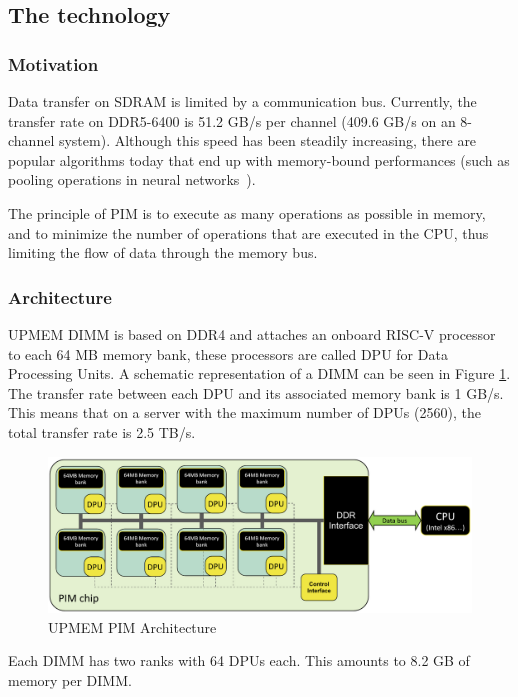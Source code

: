 \subsection{The technology}

\subsubsection{Motivation}

Data transfer on SDRAM is limited by a communication bus. Currently, the transfer rate on DDR5-6400 is 51.2 GB/s per channel (409.6 GB/s on an 8-channel system). Although this speed has been steadily increasing, there are popular algorithms today that end up with memory-bound performances (such as pooling operations in neural networks~\cite{nvidia.memory2020}).

The principle of PIM is to execute as many operations as possible in memory, and to minimize the number of operations that are executed in the CPU, thus limiting the flow of data through the memory bus.

\subsubsection{Architecture}

UPMEM DIMM is based on DDR4 and attaches an onboard RISC-V processor to each 64 MB memory bank, these processors are called DPU for Data Processing Units. A schematic representation of a DIMM can be seen in Figure \ref{fig:DIMM}. The transfer rate between each DPU and its associated memory bank is 1 GB/s. This means that on a server with the maximum number of DPUs (2560), the total transfer rate is 2.5 TB/s.

\begin{figure}[htb]
    \centering
    \includegraphics[width=0.95\linewidth]{figures/PIM.pdf}
    \caption{\label{fig:DIMM}UPMEM PIM Architecture}
\end{figure}

Each DIMM has two ranks with 64 DPUs each. This amounts to 8.2 GB of memory per DIMM.


